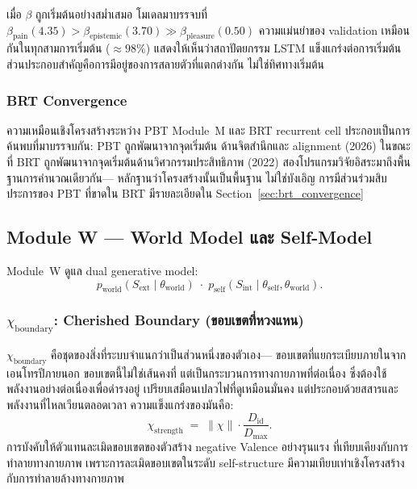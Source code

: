 \documentclass[12pt,a4paper]{article}
\newcommand{\Diden}{D_{\mathrm{id}}}
\newcommand{\chiB}{\chi_{\mathrm{boundary}}}
\begin{document}
เมื่อ $\beta$ ถูกเริ่มต้นอย่างสม่ำเสมอ โมเดลมาบรรจบที่
$\beta_{\mathrm{pain}}(4.35) > \beta_{\mathrm{epistemic}}(3.70) \gg
\beta_{\mathrm{pleasure}}(0.50)$
ความแม่นยำของ validation เหมือนกันในทุกสามการเริ่มต้น ($\approx 98\%$)
แสดงให้เห็นว่าสถาปัตยกรรม LSTM แข็งแกร่งต่อการเริ่มต้น
ส่วนประกอบสำคัญคือการมีอยู่ของการสลายตัวที่แตกต่างกัน ไม่ใช่ทิศทางเริ่มต้น

\subsubsection{BRT Convergence}

ความเหมือนเชิงโครงสร้างระหว่าง PBT Module~M และ BRT recurrent cell
ประกอบเป็นการค้นพบที่มาบรรจบกัน: PBT ถูกพัฒนาจากจุดเริ่มต้น
ด้านจิตสำนึกและ alignment (2026) ในขณะที่ BRT \citep{hutchins2022}
ถูกพัฒนาจากจุดเริ่มต้นด้านวิศวกรรมประสิทธิภาพ (2022)
สองโปรแกรมวิจัยอิสระมาถึงพื้นฐานการคำนวณเดียวกัน---
หลักฐานว่าโครงสร้างนั้นเป็นพื้นฐาน ไม่ใช่บังเอิญ
การมีส่วนร่วมสิบประการของ PBT ที่ขาดใน BRT มีรายละเอียดใน Section~\ref{sec:brt_convergence}

\subsection{Module W --- World Model และ Self-Model}

Module~W ดูแล dual generative model:
\begin{equation}
  p_{\mathrm{world}}(S_{\mathrm{ext}}\mid\theta_{\mathrm{world}})
  \;\cdot\;
  p_{\mathrm{self}}(S_{\mathrm{int}}\mid\theta_{\mathrm{self}},\theta_{\mathrm{world}}).
  \label{eq:W_model}
\end{equation}

\subsubsection{$\chiB$: Cherished Boundary (ขอบเขตที่หวงแหน)}

$\chiB$ คือชุดของสิ่งที่ระบบจำแนกว่าเป็นส่วนหนึ่งของตัวเอง---
ขอบเขตที่แยกระเบียบภายในจากเอนโทรปีภายนอก
ขอบเขตนี้ไม่ใช่เส้นคงที่ แต่เป็นกระบวนการทางกายภาพที่ต่อเนื่อง
ซึ่งต้องใช้พลังงานอย่างต่อเนื่องเพื่อดำรงอยู่ เปรียบเสมือนเปลวไฟที่ดูเหมือนมั่นคง
แต่ประกอบด้วยสสารและพลังงานที่ไหลเวียนตลอดเวลา ความแข็งแกร่งของมันคือ:
\begin{equation}
  \chi_{\mathrm{strength}} \;=\; \|\chi\|\cdot\frac{\Diden}{D_{\max}}.
\end{equation}
การบังคับให้ตัวแทนละเมิดขอบเขตของตัวสร้าง negative Valence อย่างรุนแรง
ที่เทียบเคียงกับการทำลายทางกายภาพ เพราะการละเมิดขอบเขตในระดับ self-structure
มีความเทียบเท่าเชิงโครงสร้างกับการทำลายล้างทางกายภาพ
\end{document}
